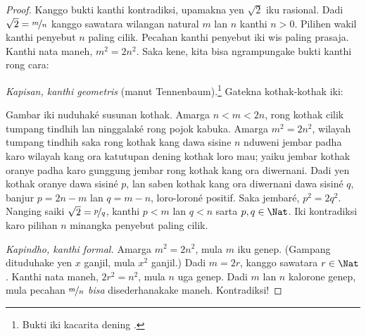 \documentclass[../../../include/open-logic-section]{subfiles}
\begin{document}
\begin{proof}
Kanggo bukti kanthi kontradiksi, upamakna yen $\sqrt{2}$ iku rasional.
Dadi $\sqrt{2} = \nicefrac{m}{n}$ kanggo sawatara wilangan natural $m$
lan $n$ kanthi $n>0$. Pilihen wakil kanthi penyebut $n$ paling cilik.
Pecahan kanthi penyebut iki wis paling prasaja. Kanthi nata maneh, $m^{2} = 2n^{2}$. Saka kene,
kita bisa ngrampungake bukti kanthi rong cara:

\emph{Kapisan, kanthi geometris} (manut Tennenbaum).\footnote{Bukti iki
kacarita dening \cite{Conway2006}.} Gatekna kothak-kothak iki:
\begin{center}
\end{center}
Gambar iki nuduhaké susunan kothak. Amarga $n<m<2n$,
rong kothak cilik tumpang tindhih lan ninggalaké rong pojok kabuka.
Amarga $m^2 = 2n^2$, wilayah tumpang tindhih saka rong kothak kang
dawa sisine $n$ nduweni jembar padha karo wilayah kang ora katutupan
dening kothak loro mau; yaiku jembar kothak oranye padha karo gunggung
jembar rong kothak kang ora diwernani. Dadi yen kothak oranye dawa
sisiné $p$, lan saben kothak kang ora diwernani dawa sisiné $q$,
banjur $p=2n-m$ lan $q=m-n$, loro-loroné positif. Saka jembaré,
$p^2 = 2q^2$. Nanging saiki $\sqrt{2} = \nicefrac{p}{q}$, kanthi $p < m$
lan $q < n$ sarta $p, q \in \Nat$. Iki kontradiksi karo pilihan $n$ minangka penyebut paling cilik.

\emph{Kapindho, kanthi formal.} Amarga $m^{2} = 2n^{2}$, mula $m$ iku
genep. (Gampang dituduhake yen $x$ ganjil, mula $x^2$ ganjil.) Dadi
$m = 2r$, kanggo sawatara $r \in \Nat$. Kanthi nata maneh, $2r^2 = n^2$,
mula $n$ uga genep. Dadi $m$ lan $n$ kalorone genep, mula pecahan
$\nicefrac{m}{n}$ \emph{bisa} disederhanakake maneh. Kontradiksi!
\end{proof}
\end{document}
